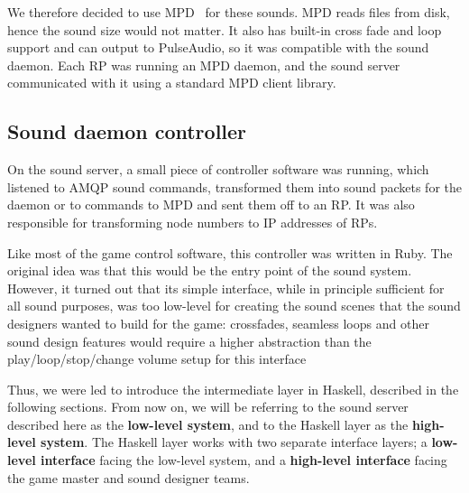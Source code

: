 We therefore decided to use MPD~\cite{mpd} for these sounds. MPD reads
files from disk, hence the sound size would not matter. It also has built-in
cross fade and loop support and can output to PulseAudio, so it was compatible with the sound daemon. Each RP was running an MPD daemon,
and the sound server communicated with it using a standard MPD client library.

\subsection{Sound daemon controller}

On the sound server, a small piece of controller software was running, which listened
to AMQP sound commands, transformed them into sound packets for the
daemon or to commands to MPD and sent them off to an RP\@. It was also responsible for transforming node numbers to IP addresses of RPs.

Like most of the game control software, this controller was written in
Ruby. The original idea was that this would be the entry point of the
sound system. However, it turned out that its simple interface, while
in principle sufficient for all sound purposes, was too low-level for
creating the sound scenes that the sound designers wanted to build for
the game: crossfades, seamless loops and other sound design features
would require a higher abstraction than the play/loop/stop/change
volume setup for this interface

Thus, we were led to introduce the intermediate layer in Haskell,
described in the following sections. From now on, we will be referring
to the sound server described here as the \textbf{low-level system},
and to the Haskell layer as the \textbf{high-level system}. The
Haskell layer works with two separate interface layers; a
\textbf{low-level interface} facing the low-level system, and a
\textbf{high-level interface} facing the game master and sound
designer teams.


